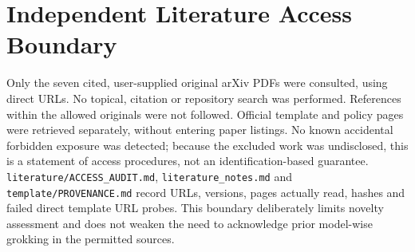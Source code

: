 \documentclass{article}
\begin{document}
\section{Independent Literature Access Boundary}
Only the seven cited, user-supplied original arXiv PDFs were consulted, using direct URLs. No topical, citation or repository search was performed. References within the allowed originals were not followed. Official template and policy pages were retrieved separately, without entering paper listings. No known accidental forbidden exposure was detected; because the excluded work was undisclosed, this is a statement of access procedures, not an identification-based guarantee. \texttt{literature/ACCESS\_AUDIT.md}, \texttt{literature\_notes.md} and \texttt{template/PROVENANCE.md} record URLs, versions, pages actually read, hashes and failed direct template URL probes. This boundary deliberately limits novelty assessment and does not weaken the need to acknowledge prior model-wise grokking in the permitted sources.
\end{document}
